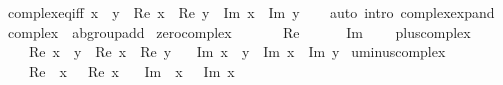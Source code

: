 \begin{isabellebody}
\ complex{\isacharunderscore}{\kern0pt}eq{\isacharunderscore}{\kern0pt}iff{\isacharcolon}{\kern0pt}\ {\isachardoublequoteopen}x\ {\isacharequal}{\kern0pt}\ y\ {\isasymlongleftrightarrow}\ Re\ x\ {\isacharequal}{\kern0pt}\ Re\ y\ {\isasymand}\ Im\ x\ {\isacharequal}{\kern0pt}\ Im\ y{\isachardoublequoteclose}\isanewline
%
\isadelimproof
\ \ %
\endisadelimproof
%
\isatagproof
{}\isamarkupfalse%
\ {\isacharparenleft}{\kern0pt}auto\ intro{\isacharcolon}{\kern0pt}\ complex{\isachardot}{\kern0pt}expand{\isacharparenright}{\kern0pt}%
\endisatagproof
{\isafoldproof}%
%
\isadelimproof
%
\endisadelimproof
%
\isadelimdocument
%
\endisadelimdocument
%
\isatagdocument
%
\isamarkuptrue%
%
\endisatagdocument
{\isafolddocument}%
%
\isadelimdocument
%
\endisadelimdocument
{}\isamarkupfalse%
\ complex\ {\isacharcolon}{\kern0pt}{\isacharcolon}{\kern0pt}\ ab{\isacharunderscore}{\kern0pt}group{\isacharunderscore}{\kern0pt}add\isanewline
{}\isanewline
\isanewline
{}\isamarkupfalse%
\ zero{\isacharunderscore}{\kern0pt}complex\isanewline
\ \ \isanewline
\ \ \ \ {\isachardoublequoteopen}Re\ {}\ {\isacharequal}{\kern0pt}\ {}{\isachardoublequoteclose}\isanewline
\ \ {\isacharbar}{\kern0pt}\ {\isachardoublequoteopen}Im\ {}\ {\isacharequal}{\kern0pt}\ {}{\isachardoublequoteclose}\isanewline
\isanewline
{}\isamarkupfalse%
\ plus{\isacharunderscore}{\kern0pt}complex\isanewline
\ \ \isanewline
\ \ \ \ {\isachardoublequoteopen}Re\ {\isacharparenleft}{\kern0pt}x\ {\isacharplus}{\kern0pt}\ y{\isacharparenright}{\kern0pt}\ {\isacharequal}{\kern0pt}\ Re\ x\ {\isacharplus}{\kern0pt}\ Re\ y{\isachardoublequoteclose}\isanewline
\ \ {\isacharbar}{\kern0pt}\ {\isachardoublequoteopen}Im\ {\isacharparenleft}{\kern0pt}x\ {\isacharplus}{\kern0pt}\ y{\isacharparenright}{\kern0pt}\ {\isacharequal}{\kern0pt}\ Im\ x\ {\isacharplus}{\kern0pt}\ Im\ y{\isachardoublequoteclose}\isanewline
\isanewline
{}\isamarkupfalse%
\ uminus{\isacharunderscore}{\kern0pt}complex\isanewline
\ \ \isanewline
\ \ \ \ {\isachardoublequoteopen}Re\ {\isacharparenleft}{\kern0pt}{\isacharminus}{\kern0pt}\ x{\isacharparenright}{\kern0pt}\ {\isacharequal}{\kern0pt}\ {\isacharminus}{\kern0pt}\ Re\ x{\isachardoublequoteclose}\isanewline
\ \ {\isacharbar}{\kern0pt}\ {\isachardoublequoteopen}Im\ {\isacharparenleft}{\kern0pt}{\isacharminus}{\kern0pt}\ x{\isacharparenright}{\kern0pt}\ {\isacharequal}{\kern0pt}\ {\isacharminus}{\kern0pt}\ Im\ x{\isachardoublequoteclose}\isanewline

\end{isabellebody}
